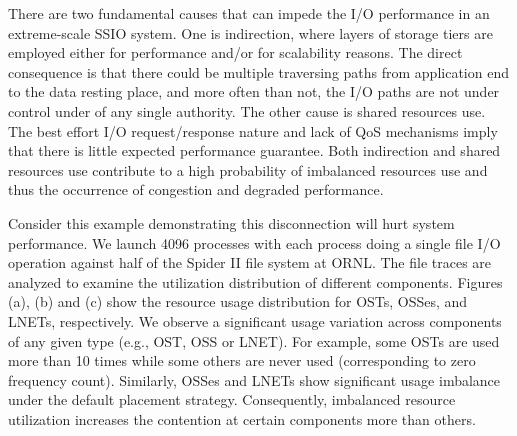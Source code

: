 There are two fundamental causes that can impede the I/O performance in an
extreme-scale SSIO system. One is indirection, where layers of storage tiers
are employed either for performance and/or for scalability reasons.  The direct
consequence is that there could be multiple traversing paths from application
end to the data resting place, and more often than not, the I/O paths are not
under control under of any single authority. The other cause is shared
resources use. The best effort I/O request/response nature and lack of QoS
mechanisms imply that there is little expected performance guarantee.  Both
indirection and shared resources use contribute to a high probability of
imbalanced resources use and thus the occurrence of congestion and degraded
performance.

Consider this example demonstrating this disconnection will hurt system
performance. We launch 4096 processes with each process doing a single file I/O
operation against half of the Spider II file system at ORNL. The file traces
are analyzed to examine the utilization distribution of different components.
Figures (a), (b) and (c) show the resource usage distribution for OSTs, OSSes,
and LNETs, respectively. We observe a significant usage variation
across components of any given type (e.g., OST, OSS or LNET). For example, some
OSTs are used more than 10 times while some others are never used
(corresponding to zero frequency count). Similarly, OSSes and LNETs show
significant usage imbalance under the default placement strategy.
Consequently, imbalanced resource utilization increases the contention at
certain components more than others.



